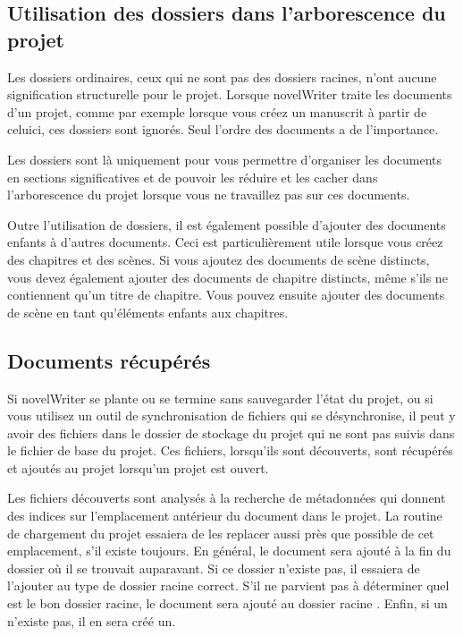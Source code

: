\documentclass[a4paper,11pt,french]{sphinxmanual}
\begin{document}
\subsection{Utilisation des dossiers dans l’arborescence du projet}
\label{\detokenize{project_overview:using-folders-in-the-project-tree}}\label{\detokenize{project_overview:a-proj-roots-dirs}}
\sphinxAtStartPar
Les dossiers ordinaires, ceux qui ne sont pas des dossiers racines, n’ont aucune signification structurelle pour le projet. Lorsque novelWriter traite les documents d’un projet, comme par exemple lorsque vous créez un manuscrit à partir de celui\sphinxhyphen{}ci, ces dossiers sont ignorés. Seul l’ordre des documents a de l’importance.

\sphinxAtStartPar
Les dossiers sont là uniquement pour vous permettre d’organiser les documents en sections significatives et de pouvoir les réduire et les cacher dans l’arborescence du projet lorsque vous ne travaillez pas sur ces documents.

\sphinxAtStartPar
Outre l’utilisation de dossiers, il est également possible d’ajouter des documents enfants à d’autres documents. Ceci est particulièrement utile lorsque vous créez des chapitres et des scènes. Si vous ajoutez des documents de scène distincts, vous devez également ajouter des documents de chapitre distincts, même s’ils ne contiennent qu’un titre de chapitre. Vous pouvez ensuite ajouter des documents de scène en tant qu’éléments enfants aux chapitres.


\subsection{Documents récupérés}
\label{\detokenize{project_overview:recovered-documents}}\label{\detokenize{project_overview:a-proj-roots-orphaned}}
\sphinxAtStartPar
Si novelWriter se plante ou se termine sans sauvegarder l’état du projet, ou si vous utilisez un outil de synchronisation de fichiers qui se désynchronise, il peut y avoir des fichiers dans le dossier de stockage du projet qui ne sont pas suivis dans le fichier de base du projet. Ces fichiers, lorsqu’ils sont découverts, sont récupérés et ajoutés au projet lorsqu’un projet est ouvert.

\sphinxAtStartPar
Les fichiers découverts sont analysés à la recherche de métadonnées qui donnent des indices sur l’emplacement antérieur du document dans le projet. La routine de chargement du projet essaiera de les replacer aussi près que possible de cet emplacement, s’il existe toujours. En général, le document sera ajouté à la fin du dossier où il se trouvait auparavant. Si ce dossier n’existe pas, il essaiera de l’ajouter au type de dossier racine correct. S’il ne parvient pas à déterminer quel est le bon dossier racine, le document sera ajouté au dossier racine . Enfin, si un  n’existe pas, il en sera créé un.
\end{document}
